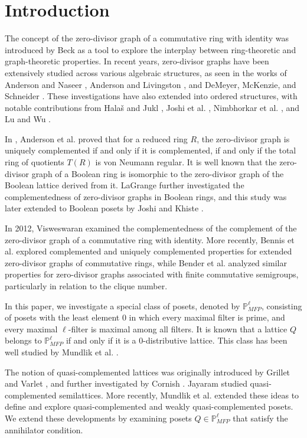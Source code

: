 \documentclass[10pt,one side,emlines]{amsart}
\theoremstyle{definition}
\begin{document}
\section{Introduction}
The concept of the zero-divisor graph of a commutative ring with identity was introduced by Beck \cite{B} as a tool to explore the interplay between ring-theoretic and graph-theoretic properties. In recent years, zero-divisor graphs have been extensively studied across various algebraic structures, as seen in the works of Anderson and Naseer \cite{AN}, Anderson and Livingston \cite{AL}, and DeMeyer, McKenzie, and Schneider \cite{DMS}. These investigations have also extended into ordered structures, with notable contributions from Hala\v{s} and Jukl \cite{HJ}, Joshi et al. \cite{VK, JA 1}, Nimbhorkar et al. \cite{NWD}, and Lu and Wu \cite{LW}.

In \cite[Theorem 3.5]{ALS}, Anderson et al. proved that for a reduced ring $R$, the zero-divisor graph is uniquely complemented if and only if it is complemented, if and only if the total ring of quotients $T(R)$ is von Neumann regular. It is well known that the zero-divisor graph of a Boolean ring is isomorphic to the zero-divisor graph of the Boolean lattice derived from it. LaGrange \cite{L} further investigated the complementedness of zero-divisor graphs in Boolean rings, and this study was later extended to Boolean posets by Joshi and Khiste \cite{JA 2}.

In 2012, Visweswaran \cite{SV} examined the complementedness of the complement of the zero-divisor graph of a commutative ring with identity. More recently, Bennis et al. \cite{BAL} explored complemented and uniquely complemented properties for extended zero-divisor graphs of commutative rings, while Bender et al. \cite{CPRL} analyzed similar properties for zero-divisor graphs associated with finite commutative semigroups, particularly in relation to the clique number.


In this paper, we investigate a special class of posets, denoted by $\mathbb{P}^{\ell}_{MFP}$, consisting of posets with the least element $0$ in which every maximal filter is prime, and every maximal $\ell$-filter is maximal among all filters. It is known that a lattice $Q$ belongs to $\mathbb{P}^{\ell}_{MFP}$ if and only if it is a $0$-distributive lattice. This class has been well studied by Mundlik et al. \cite{MJH}.

The notion of quasi-complemented lattices was originally introduced by Grillet and Varlet \cite{GV}, and further investigated by Cornish \cite{C}. Jayaram \cite{Jr} studied quasi-complemented semilattices. More recently, Mundlik et al. \cite{MJH} extended these ideas to define and explore quasi-complemented and weakly quasi-complemented posets. We extend these developments by examining posets $Q \in \mathbb{P}^{\ell}_{MFP}$ that satisfy the annihilator condition. 
\end{document}
